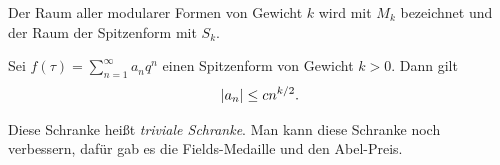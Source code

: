 Der Raum aller modularer Formen von Gewicht $k$ wird mit $M_k$
bezeichnet und der Raum der Spitzenform mit $S_k$.
\begin{thm}[Hecke]
Sei $f(\tau)=\sum_{n=1}^\infty a_n q^n$ einen Spitzenform von
Gewicht $k>0$.
Dann gilt
\begin{align*}
\left\vert a_n\right\vert \leq c n^{k/2}.
\end{align*}
\end{thm}
Diese Schranke heißt \emph{triviale Schranke}. Man kann diese Schranke noch verbessern, dafür gab es die Fields-Medaille und den Abel-Preis.
